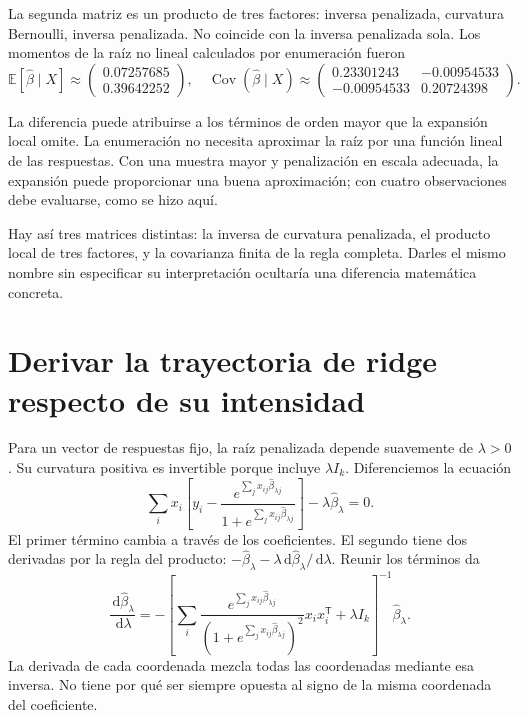 \documentclass[11pt,a4paper]{article}
\newcommand{\E}{\mathbb E}
\newcommand{\T}{^{\mathsf T}}
\newcommand{\dd}{\,\mathrm d}
\DeclareMathOperator{\Cov}{Cov}
\begin{document}
La segunda matriz es un producto de tres factores:
inversa penalizada, curvatura Bernoulli, inversa penalizada.
No coincide con la inversa penalizada sola.
Los momentos de la raíz no lineal calculados
por enumeración fueron
\[
\E[\widehat\beta\mid X]\approx\begin{pmatrix}0.07257685\\0.39642252\end{pmatrix},\quad \Cov(\widehat\beta\mid X)\approx\begin{pmatrix}0.23301243&-0.00954533\\-0.00954533&0.20724398\end{pmatrix}.
\]

La diferencia puede atribuirse a los términos de orden
mayor que la expansión local omite.
La enumeración no necesita aproximar la raíz por una
función lineal de las respuestas.
Con una muestra mayor y penalización en escala adecuada,
la expansión puede proporcionar una buena aproximación;
con cuatro observaciones debe evaluarse, como se hizo aquí.

Hay así tres matrices distintas: la inversa de curvatura
penalizada, el producto local de tres factores,
y la covarianza finita de la regla completa.
Darles el mismo nombre sin especificar su interpretación
ocultaría una diferencia matemática concreta.

\clearpage
\section{Derivar la trayectoria de ridge respecto de su intensidad}\label{logit148}
Para un vector de respuestas fijo, la raíz penalizada
depende suavemente de \(\lambda>0\).
Su curvatura positiva es invertible porque incluye
\(\lambda I_k\). Diferenciemos la ecuación
\[
\sum_i x_i\left[y_i-
\frac{e^{\sum_jx_{ij}\widehat\beta_{\lambda j}}}
{1+e^{\sum_jx_{ij}\widehat\beta_{\lambda j}}}\right]
-\lambda\widehat\beta_\lambda=0.
\]
El primer término cambia a través de los coeficientes.
El segundo tiene dos derivadas por la regla del producto:
\(-\widehat\beta_\lambda-\lambda\dd\widehat\beta_\lambda/\dd\lambda\).
Reunir los términos da
\[
\frac{\dd\widehat\beta_\lambda}{\dd\lambda}
=-\left[
\sum_i\frac{e^{\sum_jx_{ij}\widehat\beta_{\lambda j}}}
{(1+e^{\sum_jx_{ij}\widehat\beta_{\lambda j}})^2}
x_ix_i\T+\lambda I_k
\right]^{-1}\widehat\beta_\lambda.
\]
La derivada de cada coordenada mezcla todas las
coordenadas mediante esa inversa.
No tiene por qué ser siempre opuesta al signo
de la misma coordenada del coeficiente.
\end{document}
